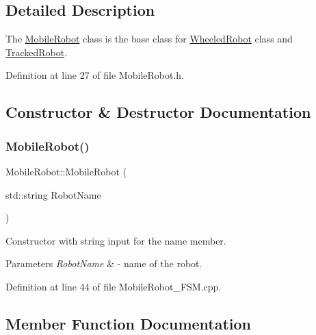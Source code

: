 \subsection{Detailed Description}
The \mbox{\hyperlink{class_mobile_robot}{Mobile\+Robot}} class is the base class for \mbox{\hyperlink{class_wheeled_robot}{Wheeled\+Robot}} class and \mbox{\hyperlink{class_tracked_robot}{Tracked\+Robot}}. 

Definition at line 27 of file Mobile\+Robot.\+h.



\subsection{Constructor \& Destructor Documentation}
\mbox{\label{class_mobile_robot_ac093af8693f0a7497daa4679a083a526}} 
\subsubsection{\texorpdfstring{MobileRobot()}{MobileRobot()}}
{\footnotesize\ttfamily Mobile\+Robot\+::\+Mobile\+Robot (\begin{DoxyParamCaption}\item[{std\+::string}]{Robot\+Name }\end{DoxyParamCaption})\hspace{0.3cm}{\ttfamily [explicit]}}



Constructor with string input for the name member. 


\begin{DoxyParams}{Parameters}
{\em Robot\+Name} & -\/ name of the robot. \\
\hline
\end{DoxyParams}


Definition at line 44 of file Mobile\+Robot\+\_\+\+F\+S\+M.\+cpp.



\subsection{Member Function Documentation}
\mbox{\label{class_mobile_robot_abb0ed1639db7efeb1b047a07826dfdc0}} 
